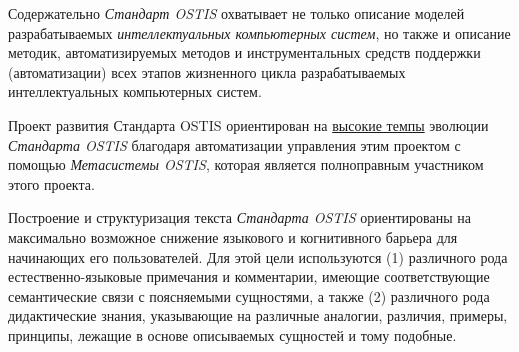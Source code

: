 Содержательно \textit{Стандарт OSTIS} охватывает не только описание моделей разрабатываемых \textit{интеллектуальных компьютерных систем}, но также и описание методик, автоматизируемых методов и инструментальных средств поддержки (автоматизации) всех этапов жизненного цикла разрабатываемых интеллектуальных компьютерных систем.

Проект развития Стандарта OSTIS ориентирован на \uline{высокие темпы} эволюции \textit{Стандарта OSTIS} благодаря автоматизации управления этим проектом с помощью \textit{Метасистемы OSTIS}, которая является полноправным участником этого проекта.

Построение и структуризация текста \textit{Стандарта OSTIS} ориентированы на максимально возможное снижение языкового и когнитивного барьера для начинающих его пользователей. Для этой цели используются (1) различного рода естественно-языковые примечания и комментарии, имеющие соответствующие семантические связи с поясняемыми сущностями, а также (2) различного рода дидактические знания, указывающие на различные аналогии, различия, примеры, принципы, лежащие в основе описываемых сущностей и тому подобные.

